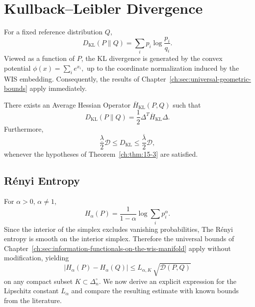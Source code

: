 \section{Kullback--Leibler Divergence}\label{ch:sec:kullback--leibler-divergence}
For a fixed reference distribution \(Q\),
\[ D_{\mathrm{KL}}(P\|Q) = \sum_i p_i
\log\frac{p_i}{q_i}. \]
Viewed as a function of \(P\), the KL divergence is generated by the
convex potential
$\phi(x)=\sum_i e^{x_i},$
up to the coordinate normalization induced by the WIS embedding.
Consequently, the results of Chapter~\ref{ch:sec:universal-geometric-bounds} apply immediately.
\begin{corollary}
\label{ch:cor:16-2}
There exists an Average Hessian Operator
$\overline H_{\mathrm{KL}}(P,Q)$
such that
\[ D_{\mathrm{KL}}(P\|Q) = \frac12 \Delta^T
\overline H_{\mathrm{KL}} \Delta. \]
Furthermore,
\[ \frac{\underline\lambda}{2} \mathcal D \le
D_{\mathrm{KL}} \le \frac{\overline\lambda}{2}
\mathcal D, \]
whenever the hypotheses of Theorem~\ref{ch:thm:15-3} are satisfied.
\end{corollary}
\subsection{R\'enyi Entropy}\label{ch:sec:renyi-entropy}
For \(\alpha>0\), \(\alpha\neq1\),
\[ H_\alpha(P) = \frac1{1-\alpha} \log
\sum_i p_i^{\alpha}. \]
Since the interior of the simplex excludes vanishing probabilities,
The R\'enyi entropy is smooth on the interior simplex.
Therefore the universal bounds of Chapter~\ref{ch:sec:information-functionals-on-the-wis-manifold} apply without modification,
yielding
\[
|H_\alpha(P)-H_\alpha(Q)|
\le
L_{\alpha,K}\,\sqrt{\mathcal D(P,Q)}
\]
on any compact subset \(K\subset\Delta_n^\circ\).
We now derive an explicit expression for the Lipschitz constant
\(L_\alpha\) and compare the resulting estimate with known bounds from
the literature.
